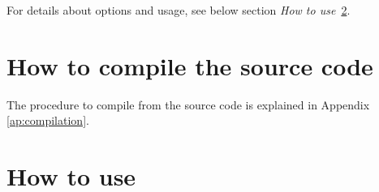 \documentclass[a4paper,fleqn]{book}
\begin{document}
For details about options and usage, see below section \textit{How to use}~\ref{sec:howto}.

%
%

\section{How to compile the source code}

The procedure to compile from the source code is explained in Appendix \ref{ap:compilation}.


\section{How to use}
\label{sec:howto}
\end{document}
